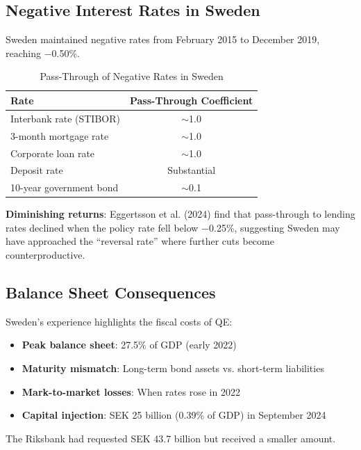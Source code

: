 \documentclass[11pt,a4paper]{article}
\begin{document}
\subsection{Negative Interest Rates in Sweden}

Sweden maintained negative rates from February 2015 to December 2019, reaching $-$0.50\%.

\begin{table}[H]
\centering
\caption{Pass-Through of Negative Rates in Sweden}
\label{tab:sweden_passthrough}
\begin{tabular}{lc}
\toprule
\textbf{Rate} & \textbf{Pass-Through Coefficient} \\
\midrule
Interbank rate (STIBOR) & $\sim$1.0 \\
3-month mortgage rate & $\sim$1.0 \\
Corporate loan rate & $\sim$1.0 \\
Deposit rate & Substantial \\
10-year government bond & $\sim$0.1 \\
\bottomrule
\end{tabular}
\end{table}

\textbf{Diminishing returns}: Eggertsson et al. (2024) find that pass-through to lending rates declined when the policy rate fell below $-$0.25\%, suggesting Sweden may have approached the ``reversal rate'' where further cuts become counterproductive.

\subsection{Balance Sheet Consequences}

Sweden's experience highlights the fiscal costs of QE:

\begin{itemize}
    \item \textbf{Peak balance sheet}: 27.5\% of GDP (early 2022)
    \item \textbf{Maturity mismatch}: Long-term bond assets vs. short-term liabilities
    \item \textbf{Mark-to-market losses}: When rates rose in 2022
    \item \textbf{Capital injection}: SEK 25 billion (0.39\% of GDP) in September 2024
\end{itemize}

The Riksbank had requested SEK 43.7 billion but received a smaller amount.
\end{document}
